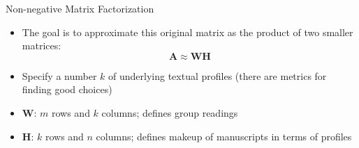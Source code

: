 \documentclass[10pt]{beamer}
\begin{document}
	\begin{frame}{Non-negative Matrix Factorization}
		\begin{itemize}
			\item The goal is to approximate this original matrix as the product of two smaller matrices:
			\begin{equation*}
				\mathbf{A} \approx \mathbf{W}\mathbf{H}
			\end{equation*}
			\item Specify a number $k$ of underlying textual profiles (there are metrics for finding good choices)
			\item $\mathbf{W}$: $m$ rows and $k$ columns; defines group readings
			\item $\mathbf{H}$: $k$ rows and $n$ columns; defines makeup of manuscripts in terms of profiles
		\end{itemize}
	\end{frame}
\end{document}
